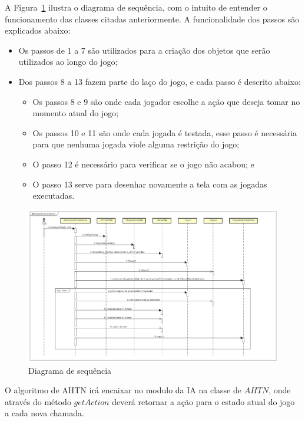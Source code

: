 A Figura~\ref{fig:sequencia} ilustra o diagrama de sequência, com o intuito de entender o funcionamento das classes citadas anteriormente. A funcionalidade dos passos são explicados abaixo: 
\begin{itemize}
	\item Os passos de 1 a 7 são utilizados para a criação dos objetos que serão utilizados ao longo do jogo;
	\item Dos passos 8 a 13 fazem parte do laço do jogo, e cada passo é descrito abaixo:
		\begin{itemize}
			\item Os passos 8 e 9 são onde cada jogador escolhe a ação que deseja tomar no momento atual do jogo;
			\item Os passos 10 e 11 são onde cada jogada é testada, esse passo é necessária para que nenhuma jogada viole alguma restrição do jogo; 
			\item O passo 12 é necessário para verificar se o jogo não acabou; e
			\item O passo 13 serve para desenhar novamente a tela com as jogadas executadas.
		\end{itemize}
\end{itemize}


\begin{figure}[ht]
	\centering
	\includegraphics[width=1\textwidth]{fig/diagramaSequencia.pdf}
	\caption{Diagrama de sequência}
	\label{fig:sequencia}
\end{figure}

O algoritmo de AHTN irá encaixar no modulo da IA na classe de $AHTN$, onde através do método $getAction$ deverá retornar a ação para o estado atual do jogo a cada nova chamada.